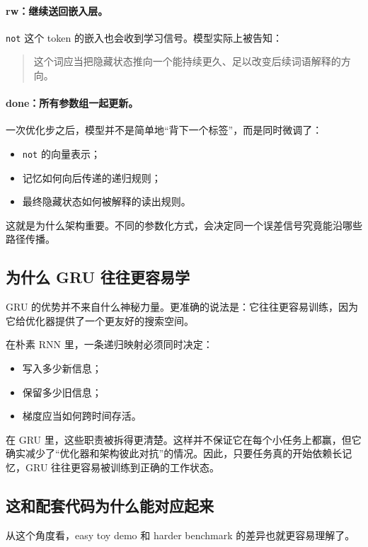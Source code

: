\documentclass[12pt,a4paper]{ctexart}
\begin{document}
\paragraph{rw：继续送回嵌入层。}
\texttt{not} 这个 token 的嵌入也会收到学习信号。模型实际上被告知：
\begin{quote}
这个词应当把隐藏状态推向一个能持续更久、足以改变后续词语解释的方向。
\end{quote}

\paragraph{done：所有参数组一起更新。}
一次优化步之后，模型并不是简单地“背下一个标签”，而是同时微调了：
\begin{itemize}
  \item \texttt{not} 的向量表示；
  \item 记忆如何向后传递的递归规则；
  \item 最终隐藏状态如何被解释的读出规则。
\end{itemize}

这就是为什么架构重要。不同的参数化方式，会决定同一个误差信号究竟能沿哪些路径传播。

\subsection{为什么 GRU 往往更容易学}

GRU 的优势并不来自什么神秘力量。更准确的说法是：它往往更容易训练，因为它给优化器提供了一个更友好的搜索空间。

在朴素 RNN 里，一条递归映射必须同时决定：
\begin{itemize}
  \item 写入多少新信息；
  \item 保留多少旧信息；
  \item 梯度应当如何跨时间存活。
\end{itemize}

在 GRU 里，这些职责被拆得更清楚。这样并不保证它在每个小任务上都赢，但它确实减少了“优化器和架构彼此对抗”的情况。因此，只要任务真的开始依赖长记忆，GRU 往往更容易被训练到正确的工作状态。

\subsection{这和配套代码为什么能对应起来}

从这个角度看，easy toy demo 和 harder benchmark 的差异也就更容易理解了。
\end{document}
